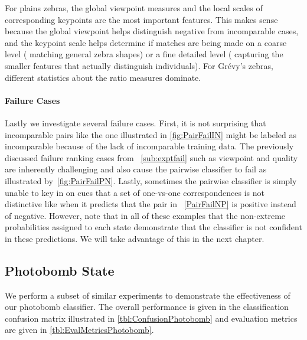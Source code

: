         For plains zebras, the global viewpoint measures and the local scales of corresponding keypoints are the
          most important features.
        This makes sense because the global viewpoint helps distinguish negative from incomparable cases, and the
          keypoint scale helps determine if matches are being made on a coarse level (\eg{} matching general zebra
          shapes) or a fine detailed level (\ie{} capturing the smaller features that actually distinguish
          individuals).
        For Grévy's zebras, different statistics about the ratio measures dominate.



        \MatchWordCloud{}
        \ImportantMatchFeat{}

        \paragraph{Failure Cases}

        Lastly we investigate several failure cases.
        First, it is not surprising that incomparable pairs like the one illustrated in \cref{fig:PairFailIN}
          might be labeled as incomparable because of the lack of incomparable training data.
        The previously discussed failure ranking cases from ~\cref{sub:exptfail} such as viewpoint and quality
          are inherently challenging and also cause the pairwise classifier to fail as illustrated
          by~\cref{fig:PairFailPN}.
        Lastly, sometimes the pairwise classifier is simply unable to key in on cues that a set of one-vs-one
          correspondences is not distinctive like when it predicts that the pair in ~\cref{PairFailNP} is positive
          instead of negative.
        However, note that in all of these examples that the non-extreme probabilities assigned to each state
          demonstrate that the classifier is not confident in these predictions.
        We will take advantage of this in the next chapter.
        

        \PairFailIN{} 

        \PairFailPN{}

        \PairFailNP{}


    \subsection{Photobomb State}
        We perform a subset of similar experiments to demonstrate the effectiveness of our photobomb classifier.
        The overall performance is given in the classification confusion matrix illustrated in
          \cref{tbl:ConfusionPhotobomb} and evaluation metrics are given in \cref{tbl:EvalMetricsPhotobomb}.

